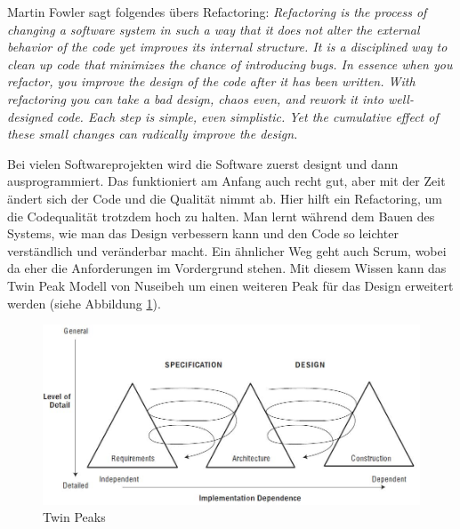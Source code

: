 Martin Fowler sagt folgendes übers Refactoring: \textit{Refactoring is the process of changing a software system in such a way that it does not alter the external behavior of the code yet improves its internal structure. It is a disciplined way to clean up code that minimizes the chance of introducing bugs. In essence when you refactor, you improve the design of the code after it has been written. With refactoring you can take a bad design, chaos even, and rework it into well-designed code. Each step is simple, even simplistic. Yet the cumulative effect of these small changes can radically improve the design.}

Bei vielen Softwareprojekten wird die Software zuerst designt und dann ausprogrammiert. Das funktioniert am Anfang auch recht gut, aber mit der Zeit ändert sich der Code und die Qualität nimmt ab. Hier hilft ein Refactoring, um die Codequalität trotzdem hoch zu halten. Man lernt während dem Bauen des Systems, wie man das Design verbessern kann und den Code so leichter verständlich und veränderbar macht. Ein ähnlicher Weg geht auch Scrum, wobei da eher die Anforderungen im Vordergrund stehen. Mit diesem Wissen kann das Twin Peak Modell von Nuseibeh um einen weiteren Peak für das Design erweitert werden (siehe Abbildung \ref{fig:twin-peaks-1}).

\begin{figure}[h!]
\centering
\includegraphics[width=0.7\linewidth]{fig/twin-peaks}
\caption{Twin Peaks}
\label{fig:twin-peaks-1}
\end{figure}

\newpage

